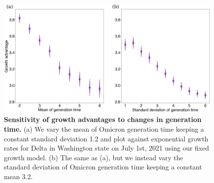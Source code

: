 \documentclass[11pt,oneside,letterpaper]{article}
\begin{document}
\begin{figure}
  \centering
  \includegraphics[width=\linewidth]{figs/growth_advantage_sensitivity.png}
  \caption{\textbf{Sensitivity of growth advantages to changes in generation time.} 
(a) We vary the mean of Omicron generation time keeping a constant standard deviation 1.2 and plot against exponential growth rates for Delta in Washington state on July 1st, 2021 using our fixed growth model.
(b) The same as (a), but we instead vary the standard deviation of Omicron generation time keeping a constant mean 3.2.}%
  \label{fig:growth_advantage_sensitivity}
\end{figure}
\end{document}
